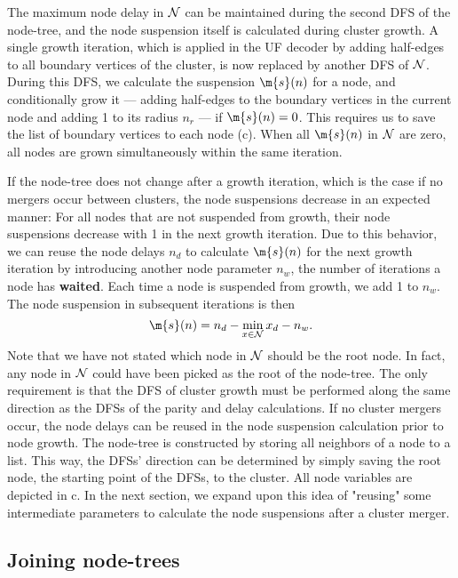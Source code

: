 The maximum node delay in $\mathcal{N}$ can be maintained during the second DFS of the node-tree, and the node suspension itself is calculated during cluster growth. A single growth iteration, which is applied in the UF decoder by adding half-edges to all boundary vertices of the cluster, is now replaced by another DFS of $\mathcal{N}$. During this DFS, we calculate the suspension $\m{s}(n)$ for a node, and conditionally grow it --- adding half-edges to the boundary vertices in the current node and adding 1 to its radius $n_r$ --- if $\m{s}(n) = 0$. This requires us to save the list of boundary vertices to each node (c). When all $\m{s}(n)$ in $\mathcal{N}$ are zero, all nodes are grown simultaneously within the same iteration. 

If the node-tree does not change after a growth iteration, which is the case if no mergers occur between clusters, the node suspensions decrease in an expected manner: For all nodes that are not suspended from growth, their node suspensions decrease with 1 in the next growth iteration. Due to this behavior, we can reuse the node delays $n_d$ to calculate $\m{s}(n)$ for the next growth iteration by introducing another node parameter $n_w$, the number of iterations a node has \textbf{waited}. Each time a node is suspended from growth, we add 1 to $n_w$. The node suspension in subsequent iterations is then
\begin{equation}\label{eq:suspension}
    \m{s}(n) = n_d - \min_{x \in \nset}{x_d} - n_w. 
\end{equation}
Note that we have not stated which node in $\mathcal{N}$ should be the root node. In fact, any node in $\mathcal{N}$ could have been picked as the root of the node-tree. The only requirement is that the DFS of cluster growth must be performed along the same direction as the DFSs of the parity and delay calculations. If no cluster mergers occur, the node delays can be reused in the node suspension calculation prior to node growth. The node-tree is constructed by storing all neighbors of a node to a list. This way, the DFSs' direction can be determined by simply saving the root node, the starting point of the DFSs, to the cluster. All node variables are depicted in c. 
In the next section, we expand upon this idea of "reusing" some intermediate parameters to calculate the node suspensions after a cluster merger.  


\subsection{Joining node-trees}\label{sec:nodejoin}

